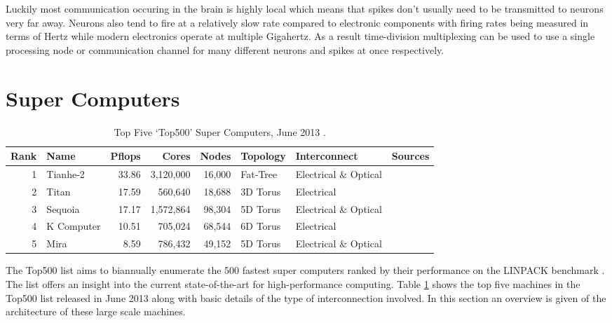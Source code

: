 			Luckily most communication occuring in the brain is highly local which
			means that spikes don't usually need to be transmitted to neurons very far
			away. Neurons also tend to fire at a relatively slow rate compared to
			electronic components with firing rates being measured in terms of Hertz
			while modern electronics operate at multiple Gigahertz. As a result
			time-division multiplexing can be used to use a single processing node or
			communication channel for many different neurons and spikes at once
			respectively.
	
	
	\section{Super Computers}
		
		\label{sec:super-computers}
		
		\begin{table}
			\center
			\begin{tabular}{r l r r r l l l}
				\toprule
				Rank & Name    & Pflops& Cores  & Nodes  & Topology & Interconnect          & Sources \\
				\midrule                          
				1 & Tianhe-2   & 33.86 & 3,120,000 & 16,000 & Fat-Tree & Electrical \& Optical & \cite{dongarra13} \\
				2 & Titan      & 17.59 & 560,640   & 18,688 & 3D Torus & Electrical            & \cite{bland12} \\
				3 & Sequoia    & 17.17 & 1,572,864 & 98,304 & 5D Torus & Electrical \& Optical & \cite{prickett10} \\
				4 & K Computer & 10.51 & 705,024   & 68,544 & 6D Torus & Electrical            & \cite{fujitsu11,yokokawa11} \\
				5 & Mira       &  8.59 & 786,432   & 49,152 & 5D Torus & Electrical \& Optical & \cite{prickett10} \\
				\bottomrule
			\end{tabular}
			
			\caption{Top Five `Top500' Super Computers, June 2013 \cite{meuer13}.}
			\label{tab:top500}
		\end{table}
		
		The Top500 list \cite{meuer13} aims to biannually enumerate the 500 fastest
		super computers ranked by their performance on the LINPACK benchmark
		\cite{dongarraLINPAC}. The list offers an insight into the current
		state-of-the-art for high-performance computing. Table \ref{tab:top500}
		shows the top five machines in the Top500 list released in June 2013 along
		with basic details of the type of interconnection involved. In this section
		an overview is given of the architecture of these large scale machines.
		

